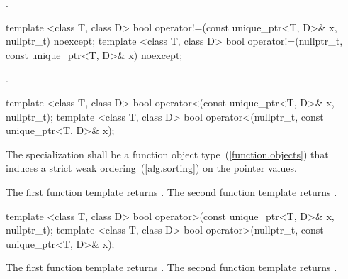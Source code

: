 \begin{itemdescr}
\pnum
\returns {}.
\end{itemdescr}

%
%
\begin{itemdecl}
template <class T, class D>
  bool operator!=(const unique_ptr<T, D>& x, nullptr_t) noexcept;
template <class T, class D>
  bool operator!=(nullptr_t, const unique_ptr<T, D>& x) noexcept;
\end{itemdecl}

\begin{itemdescr}
\pnum
\returns {}.
\end{itemdescr}

%
%
\begin{itemdecl}
template <class T, class D>
  bool operator<(const unique_ptr<T, D>& x, nullptr_t);
template <class T, class D>
  bool operator<(nullptr_t, const unique_ptr<T, D>& x);
\end{itemdecl}

\begin{itemdescr}
\pnum
\requires The specialization  shall be
a function object type~(\ref{function.objects}) that induces a strict weak
ordering~(\ref{alg.sorting}) on the pointer values.

\pnum
\returns
The first function template returns
.
The second function template returns
.
\end{itemdescr}

%
%
\begin{itemdecl}
template <class T, class D>
  bool operator>(const unique_ptr<T, D>& x, nullptr_t);
template <class T, class D>
  bool operator>(nullptr_t, const unique_ptr<T, D>& x);
\end{itemdecl}

\begin{itemdescr}
\pnum
\returns
The first function template returns .
The second function template returns .
\end{itemdescr}

